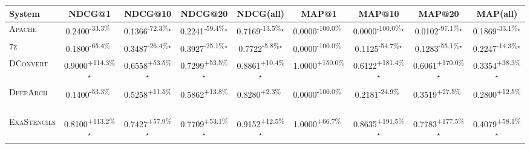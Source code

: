 \begin{table}[htbp]
\centering
\renewcommand{\arraystretch}{1.2}
\begin{tabular}{l|cccc|cccc}
\hline
System & NDCG@1 & NDCG@10 & NDCG@20 & NDCG(all) & MAP@1 & MAP@10 & MAP@20 & MAP(all) \\ \hline
\textsc{Apache} & \cellcolor{red!30}0.2400\textsuperscript{-33.3\%}$^{\,\,\,}$ & \cellcolor{red!30}0.1366\textsuperscript{-72.3\%}$^\star$ & \cellcolor{red!30}0.2241\textsuperscript{-59.4\%}$^\star$ & \cellcolor{red!30}0.7169\textsuperscript{-13.5\%}$^\star$ & \cellcolor{red!30}0.0000\textsuperscript{-100.0\%}$^{\,\,\,}$ & \cellcolor{red!30}0.0000\textsuperscript{-100.0\%}$^\star$ & \cellcolor{red!30}0.0102\textsuperscript{-97.1\%}$^\star$ & \cellcolor{red!30}0.1869\textsuperscript{-33.1\%}$^\star$ \\
\textsc{7z} & \cellcolor{red!30}0.1800\textsuperscript{-65.4\%}$^{\,\,\,}$ & \cellcolor{red!30}0.3487\textsuperscript{-26.4\%}$^\star$ & \cellcolor{red!30}0.3927\textsuperscript{-25.1\%}$^\star$ & \cellcolor{red!30}0.7722\textsuperscript{-5.8\%}$^\star$ & \cellcolor{red!30}0.0000\textsuperscript{-100.0\%}$^{\,\,\,}$ & \cellcolor{red!30}0.1125\textsuperscript{-54.7\%}$^\star$ & \cellcolor{red!30}0.1283\textsuperscript{-55.1\%}$^\star$ & \cellcolor{red!30}0.2247\textsuperscript{-14.3\%}$^\star$ \\
\textsc{DConvert} & \cellcolor{green!30}0.9000\textsuperscript{+114.3\%}$^\star$ & \cellcolor{green!30}0.6558\textsuperscript{+53.5\%}$^\star$ & \cellcolor{green!30}0.7299\textsuperscript{+53.5\%}$^\star$ & \cellcolor{green!30}0.8861\textsuperscript{+10.4\%}$^\star$ & \cellcolor{green!30}1.0000\textsuperscript{+150.0\%}$^{\,\,\,}$ & \cellcolor{green!30}0.6122\textsuperscript{+181.4\%}$^\star$ & \cellcolor{green!30}0.6061\textsuperscript{+170.0\%}$^\star$ & \cellcolor{green!30}0.3354\textsuperscript{+38.3\%}$^\star$ \\
\textsc{DeepArch} & \cellcolor{red!30}0.1400\textsuperscript{-53.3\%}$^{\,\,\,}$ & \cellcolor{green!30}0.5258\textsuperscript{+11.5\%}$^{\,\,\,}$ & \cellcolor{green!30}0.5862\textsuperscript{+13.8\%}$^{\,\,\,}$ & \cellcolor{green!30}0.8280\textsuperscript{+2.3\%}$^{\,\,\,}$ & \cellcolor{red!30}0.0000\textsuperscript{-100.0\%}$^{\,\,\,}$ & \cellcolor{red!30}0.2181\textsuperscript{-24.9\%}$^{\,\,\,}$ & \cellcolor{green!30}0.3519\textsuperscript{+27.5\%}$^{\,\,\,}$ & \cellcolor{green!30}0.2800\textsuperscript{+12.5\%}$^{\,\,\,}$ \\
\textsc{ExaStencils} & \cellcolor{green!30}0.8100\textsuperscript{+113.2\%}$^\star$ & \cellcolor{green!30}0.7427\textsuperscript{+57.9\%}$^\star$ & \cellcolor{green!30}0.7709\textsuperscript{+53.1\%}$^\star$ & \cellcolor{green!30}0.9152\textsuperscript{+12.5\%}$^\star$ & \cellcolor{green!30}1.0000\textsuperscript{+66.7\%}$^{\,\,\,}$ & \cellcolor{green!30}0.8635\textsuperscript{+191.5\%}$^\star$ & \cellcolor{green!30}0.7783\textsuperscript{+177.5\%}$^\star$ & \cellcolor{green!30}0.4079\textsuperscript{+58.1\%}$^\star$ \\

\end{tabular}
\end{table}
